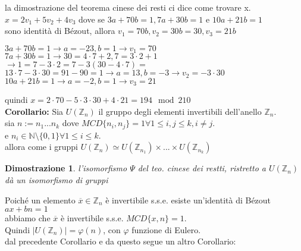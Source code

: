 \documentclass[a4paper,12pt]{article}
\theoremstyle{def}
\theoremstyle{prop}
\theoremstyle{esempio}
\theoremstyle{dimostrazione}
\newtheorem*{dimostrazione}{Dimostrazione}
\theoremstyle{teo}
\theoremstyle{osservazione}
\begin{document}
la dimostrazione del teorema cinese dei resti ci dice come trovare x.\\
\(x = 2 v_1 + 5 v_2 + 4 v_3\) dove se \(3 a + 70 b = 1, 7 a + 30 b = 1\) e \(10 a + 21 b = 1\)\\
sono identità di Bézout, allora \(v_1 = 70 b, v_2 = 30 b  = 30, v_3 = 21 b\)\\
\begin{center}
    \(3 a + 70 b = 1 \rightarrow a = -23, b = 1 \rightarrow v_1 = 70\)\\
    \(7 a + 30 b = 1 \rightarrow 30 = 4 \cdot 7 + 2 , 7 = 3 \cdot 2 + 1\)\\
    \(\rightarrow 1 = 7 - 3 \cdot 2 = 7 - 3(30 - 4 \cdot 7) = \)\\
    \(13 \cdot 7 - 3 \cdot 30 = 91 - 90 = 1 \rightarrow a = 13, b = -3 \rightarrow v_2 = -3 \cdot 30\)\\
    \(10 a + 21 b = 1 \rightarrow a = -2, b = 1 \rightarrow v_3 = 21\)\\
\end{center}

quindi \(x = 2 \cdot 70 - 5 \cdot 3 \cdot 30 + 4 \cdot 21 = 194\mod 210\)\\

\textbf{Corollario:} Sia \(U(\mathbb{Z}_n)\) il gruppo degli elementi invertibili dell'anello \(\mathbb{Z}_n\).\\
sia \(n := n_1 ... n_k\) dove \(MCD\{n_i, n_j\} = 1 \forall 1 \leq i,j \leq k, i \neq j\).\\
e \(n_i \in \mathbb{N} \setminus \{0,1\} \forall 1 \leq i \leq k\).\\
allora come i gruppi \(U(\mathbb{Z}_n) \simeq U(\mathbb{Z}_{n_1}) \times ... \times U(\mathbb{Z}_{n_k})\)

\begin{dimostrazione}
    l'isomorfismo \(\Psi\) del teo. cinese dei restti, ristretto a \(U(\mathbb{Z}_n)\) dà un isomorfismo di gruppi\\
\end{dimostrazione}

Poiché un elemento \(\overline{x} \in \mathbb{Z}_n\) è invertibile s.s.e. esiste un'identità di Bézout \(ax + bn = 1\)\\
abbiamo che \(\overline{x}\) è invertibile s.s.e. \(MCD\{x,n\} = 1\).\\
Quindi \(|U(\mathbb{Z}_n)| = \varphi(n)\), con \(\varphi\) funzione di Eulero.\\

dal precedente Corollario e da questo segue un altro Corollario:
\end{document}
